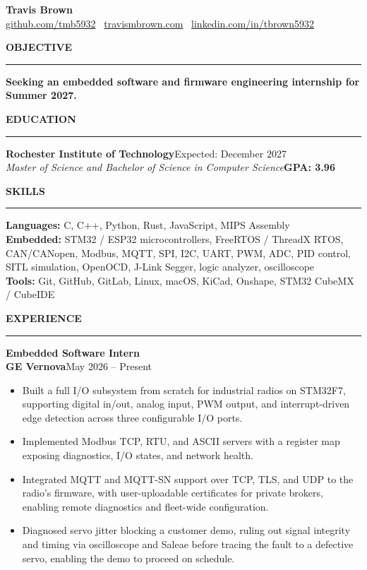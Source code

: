 \documentclass[10pt]{article}
\newcommand{\resumesection}[1]{%
  \vspace{5pt}%
  \noindent\textbf{#1}\\[-8pt]%
  \noindent\rule{\linewidth}{0.5pt}%
  \vspace{1pt}%
}
\newcommand{\entry}[3]{%
  \noindent\textbf{#1}\\%
  \noindent\textbf{#2}\hfill#3%
}
\begin{document}
\begin{center}
  {\LARGE\textbf{Travis Brown}}\\[2pt]
  \href{https://github.com/tmb5932}{github.com/tmb5932} \textbullet\
  \href{https://www.travismbrown.com}{travismbrown.com} \textbullet\
  \href{https://www.linkedin.com/in/tbrown5932}{linkedin.com/in/tbrown5932}
\end{center}

\resumesection{OBJECTIVE}
\textbf{Seeking an embedded software and firmware engineering internship for Summer 2027.}

\resumesection{EDUCATION}
\noindent\textbf{Rochester Institute of Technology}\hfill Expected: December 2027\\
\textit{Master of Science and Bachelor of Science in Computer Science}\hfill\textbf{GPA: 3.96}

\resumesection{SKILLS}
\noindent\textbf{Languages:} C, C++, Python, Rust, JavaScript, MIPS Assembly\\[3pt]
\noindent\textbf{Embedded:} STM32 / ESP32 microcontrollers, FreeRTOS / ThreadX RTOS, CAN/CANopen, Modbus, MQTT, SPI, I2C, UART, PWM, ADC, PID control, SITL simulation, OpenOCD, J-Link Segger, logic analyzer, oscilloscope\\[3pt]
\noindent\textbf{Tools:} Git, GitHub, GitLab, Linux, macOS, KiCad, Onshape, STM32 CubeMX / CubeIDE

\resumesection{EXPERIENCE}

\entry{Embedded Software Intern}{GE Vernova}{May 2026 – Present}
\begin{itemize}
  \item Built a full I/O subsystem from scratch for industrial radios on STM32F7, supporting digital in/out, analog input, PWM output, and interrupt-driven edge detection across three configurable I/O ports.
  \item Implemented Modbus TCP, RTU, and ASCII servers with a register map exposing diagnostics, I/O states, and network health.
  \item Integrated MQTT and MQTT-SN support over TCP, TLS, and UDP to the radio's firmware, with user-uploadable certificates for private brokers, enabling remote diagnostics and fleet-wide configuration.
  \item Diagnosed servo jitter blocking a customer demo, ruling out signal integrity and timing via oscilloscope and Saleae before tracing the fault to a defective servo, enabling the demo to proceed on schedule.
\end{itemize}
\end{document}
